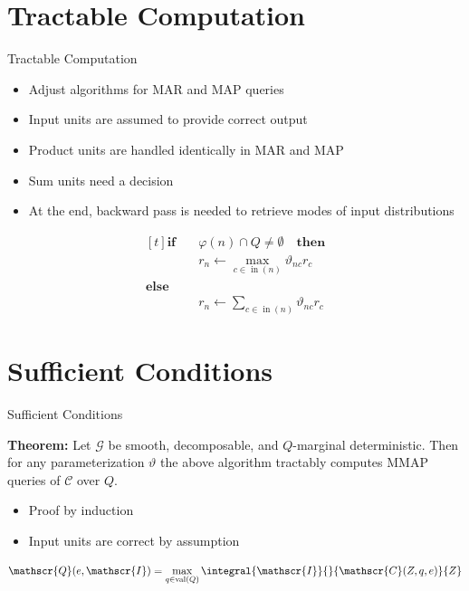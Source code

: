 \documentclass[aspectratio=169]{beamer}
\DeclareMathOperator{\val}{val}
\DeclareMathOperator{\nodein}{in}
\begin{document}
\section{Tractable Computation}
  \begin{frame}{Tractable Computation}
    \begin{itemize}
      \item Adjust algorithms for MAR and MAP queries
      \item Input units are assumed to provide correct output
      \item Product units are handled identically in MAR and MAP
      \item Sum units need a decision
      \item At the end, backward pass is needed to retrieve modes of input distributions
    \end{itemize}
    \begin{mybox}
      \[
        \begin{aligned}[t]
          \mathbf{if}\quad &φ(n) \cap Q \neq \emptyset \quad \mathbf{then} \\
          & r_n \longleftarrow \max_{c\in\nodein(n)} ϑ_{nc}r_c \\
          \mathbf{else} \\
          & r_n \longleftarrow \sum_{c\in\nodein(n)} ϑ_{nc}r_c
        \end{aligned}
      \]
    \end{mybox}
  \end{frame}

\section{Sufficient Conditions}
  \begin{frame}{Sufficient Conditions}
    \begin{mybox}
      \textbf{Theorem:}
      Let $\mathscr{G}$ be smooth, decomposable, and $Q$-marginal deterministic.
      Then for any parameterization $ϑ$ the above algorithm
      tractably computes MMAP queries of $\mathscr{C}$ over $Q$.
    \end{mybox}
    \begin{itemize}
      \item Proof by induction
      \item Input units are correct by assumption
    \end{itemize}
    \[
      \mathscr{Q}(e,\mathscr{I}) = \max_{q\in\val(Q)} \integral{\mathscr{I}}{}{\mathscr{C}(Z,q,e)}{Z}
    \]
  \end{frame}
\end{document}

